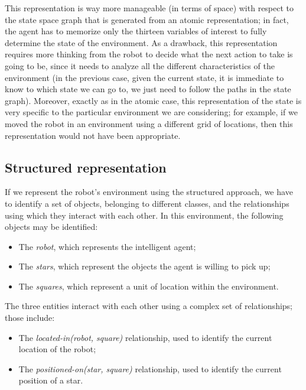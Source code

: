 \documentclass[letterpaper,headings=standardclasses]{scrartcl}
\begin{document}
This representation is way more manageable (in terms of space) with respect to the state space graph that is generated from an atomic representation; in fact, the agent has to memorize only the thirteen variables of interest to fully determine the state of the environment. As a drawback, this representation requires more thinking from the robot to decide what the next action to take is going to be, since it needs to analyze all the different characteristics of the environment (in the previous case, given the current state, it is immediate to know to which state we can go to, we just need to follow the paths in the state graph). Moreover, exactly as in the atomic case, this representation of the state is very specific to the particular environment we are considering; for example, if we moved the robot in an environment using a different grid of locations, then this representation would not have been appropriate. 

\subsection{Structured representation}

If we represent the robot’s environment using the structured approach, we have to identify a set of objects, belonging to different classes, and the relationships using which they interact with each other. In this environment, the following objects may be identified:

\begin{itemize}

\item The \emph{robot}, which represents the intelligent agent;

\item The \emph{stars}, which represent the objects the agent is willing to pick up;

\item The \emph{squares}, which represent a unit of location within the environment.

\end{itemize}

The three entities interact with each other using a complex set of relationships; those include:

\begin{itemize}

\item The \emph{located-in(robot, square)} relationship, used to identify the current location of the robot;

\item The \emph{positioned-on(star, square)} relationship, used to identify the current position of a star.

\end{itemize}
\end{document}
